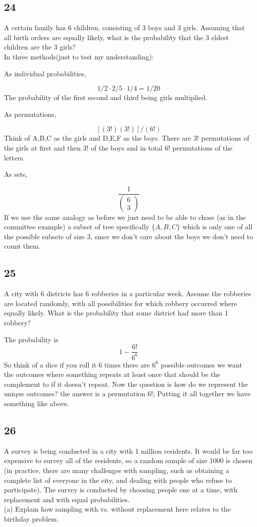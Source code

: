 \documentclass{article}
\begin{document}
\subsection{24}
A certain family has 6 children, consisting of 3 boys and 3 girls. Assuming that all birth orders are equally likely, what is the probability that the 3 eldest children are the 3 girls? 
\\
In three methods(just to test my understanding):

As individual probabilities,

$$ 1/2 \cdot 2/5 \cdot 1/4 = 1/20$$
The probability of the first second and third being girls multiplied.

As permutations,

$$[(3!)(3!)]/(6!)$$ Think of A,B,C as the girls and D,E,F as the boys. There are 3! permutations of the girls at first and then 3! of the boys and in total 6! permutations of the letters.

As sets,

$$ \frac{1}{ \begin{pmatrix}
6\\
3
\end{pmatrix}}$$ If we use the same analogy as before we just need to be able to chose (as in the committee example) a subset of tree specifically $\{A,B,C\}$ which is only one of all the possible subsets of size 3, since we don't care about the boys we don't need to count them.
\subsection{25}
A city with 6 districts has 6 robberies in a particular week. Assume the robberies are located randomly, with all possibilities for which robbery occurred where equally likely. What is the probability that some district had more than 1 robbery?

The probability is $$1- \frac{6!}{6^6}$$ So think of a dice if you roll it 6 times there are $6^6$ possible outcomes we want the outcomes where something repeats at least once that should be the complement to if it doesn't repeat. Now the question is how do we represent the unique outcomes? the answer is a permutation 6!; Putting it all together we have something like above.

\subsection{26}
A survey is being conducted in a city with 1 million residents. It would be far too expensive to survey all of the residents, so a random sample of size 1000 is chosen (in practice, there are many challenges with sampling, such as obtaining a complete list of everyone in the city, and dealing with people who refuse to participate). The survey is conducted by choosing people one at a time, with replacement and with equal probabilities.\\
(a) Explain how sampling with vs. without replacement here relates to the birthday problem.
\end{document}
